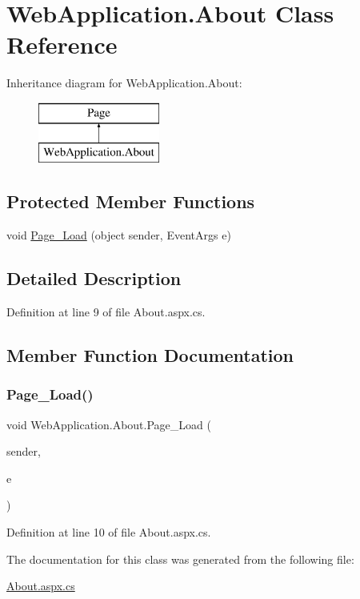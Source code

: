 \hypertarget{classWebApplication_1_1About}{}\section{Web\+Application.\+About Class Reference}
\label{classWebApplication_1_1About}
Inheritance diagram for Web\+Application.\+About\+:\begin{figure}[H]
\begin{center}
\leavevmode
\includegraphics[height=2.000000cm]{db/d5c/classWebApplication_1_1About}
\end{center}
\end{figure}
\subsection*{Protected Member Functions}
\begin{DoxyCompactItemize}
\item 
void \mbox{\hyperlink{classWebApplication_1_1About_ab4ff9f7fcbc304d508c0ae1b96e585c7}{Page\+\_\+\+Load}} (object sender, Event\+Args e)
\end{DoxyCompactItemize}


\subsection{Detailed Description}


Definition at line 9 of file About.\+aspx.\+cs.



\subsection{Member Function Documentation}
\mbox{\label{classWebApplication_1_1About_ab4ff9f7fcbc304d508c0ae1b96e585c7}} 
\subsubsection{\texorpdfstring{Page\_Load()}{Page\_Load()}}
{\footnotesize\ttfamily void Web\+Application.\+About.\+Page\+\_\+\+Load (\begin{DoxyParamCaption}\item[{object}]{sender,  }\item[{Event\+Args}]{e }\end{DoxyParamCaption})\hspace{0.3cm}{\ttfamily [protected]}}



Definition at line 10 of file About.\+aspx.\+cs.



The documentation for this class was generated from the following file\+:\begin{DoxyCompactItemize}
\item 
\mbox{\hyperlink{About_8aspx_8cs}{About.\+aspx.\+cs}}\end{DoxyCompactItemize}
